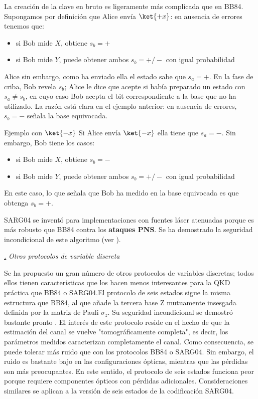 \documentclass[a4paper,11pt]{book} %
\numberwithin{equation}{chapter}
\def\subsubiContadorIt{\par\addtocounter{subsubsection}{1}\underline{\it\thesubsubsection.}\hskip0.5cm \setcounter{subsubsubsectionIt}{0}}
\newcommand{\SubsubiIt}[1]{
		\subsubiContadorIt \textit{#1}
	}
\newcounter{subsubsubsectionIt}[subsubsection]
\begin{document}
La creación de la clave en bruto es ligeramente más complicada que en BB84. Supongamos por definición que Alice envía $\ket{+x}$: en ausencia de errores tenemos que:
\begin{itemize}
	\item si Bob mide $X$, obtiene $s_b = +$
	\item si Bob mide $Y$, puede obtener ambos $s_b= +/-$ con igual probabilidad
\end{itemize}  
Alice sin embargo, como ha enviado ella el estado sabe que $s_a = +$. En la fase de criba, Bob revela $s_b$; Alice le dice que acepte si había preparado un estado con $s_a \neq s_b$, en cuyo caso Bob acepta el bit correspondiente a la base que no ha utilizado. La razón está clara en el ejemplo anterior: en ausencia de errores, $s_b= -$ señala la base equivocada.

	\begin{mybox_blue}{Ejemplo con $\ket{-x}$}
	Si Alice envía $\ket{-x}$ ella tiene que $s_a = -$. Sin embargo, Bob tiene los casos:
	\begin{itemize}
		\item si Bob mide $X$, obtiene $s_b = -$
		\item si Bob mide $Y$, puede obtener ambos $s_b= +/-$ con igual probabilidad
	\end{itemize} 
	En este caso, lo que señala que Bob ha medido en la base equivocada es que obtenga $s_b = +$.
	\end{mybox_blue}

SARG04 se inventó para implementaciones con fuentes láser atenuadas porque es más robusto que BB84 contra los \textbf{ataques PNS}. Se ha demostrado la seguridad incondicional de este algoritmo (ver \cite{QKD_resumen}).


			\SubsubiIt{Otros protocolos de variable discreta}

Se ha propuesto un gran número de otros protocolos de variables discretas; todos ellos tienen características que los hacen menos interesantes para la QKD práctica que BB84 o SARG04.El protocolo de seis estados \cite{QKD_Six_state_2,QKD_Six_state_3} sigue la misma estructura que BB84, al que añade la tercera base Z mutuamente insesgada definida por la matriz de Pauli $\sigma_z$. Su seguridad incondicional se demostró bastante pronto \cite{QKD_Six_state_lo2001proof}. El interés de este protocolo reside en el hecho de que la estimación del canal se vuelve "tomográficamente completa", es decir, los parámetros medidos caracterizan completamente el canal. Como consecuencia, se puede tolerar más ruido que con los protocolos BB84 o SARG04. Sin embargo, el ruido es bastante bajo en las configuraciones ópticas, mientras que las pérdidas son más preocupantes. En este sentido, el protocolo de seis estados funciona peor porque requiere componentes ópticos con pérdidas adicionales. Consideraciones similares se aplican a la versión de seis estados de la codificación SARG04.
\end{document}

